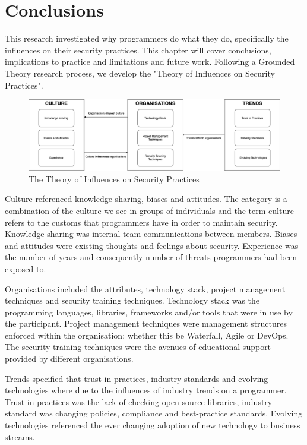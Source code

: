 \chapter{Conclusions}\label{C:Conclusions}

This research investigated why programmers do what they do, specifically the influences on their security practices. This chapter will cover conclusions, implications to practice and limitations and future work. Following a Grounded Theory research process, we develop the "Theory of Influences on Security Practices".
\newline
\par
\begin{figure}[ht]
\includegraphics[width=17cm]{figures/fig2.png}
\centering
\caption{The Theory of Influences on Security Practices}
\centering
\end{figure}
\newline
\par
Culture referenced knowledge sharing, biases and attitudes. The category is a combination of the culture we see in groups of individuals and the term culture refers to the customs that programmers have in order to maintain security. Knowledge sharing was internal team communications between members. Biases and attitudes were existing thoughts and feelings about security. Experience was the number of years and consequently number of threats programmers had been exposed to. 
\newline
\par
Organisations included the attributes, technology stack, project management techniques and security training techniques. Technology stack was the programming languages, libraries, frameworks and/or tools that were in use by the participant. Project management techniques were management structures enforced within the organisation; whether this be Waterfall, Agile or DevOps. The security training techniques were the avenues of educational support provided by different organisations.  
\newline
\par
Trends specified that trust in practices, industry standards and evolving technologies where due to the influences of industry trends on a programmer. Trust in practices was the lack of checking open-source libraries, industry standard was changing policies, compliance and best-practice standards. Evolving technologies referenced the ever changing adoption of new technology to business streams.
